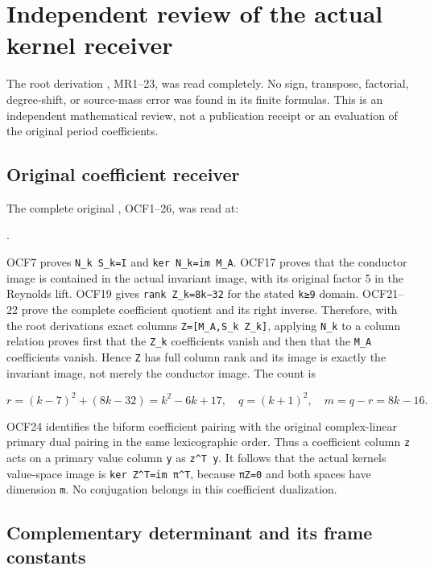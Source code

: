 \documentclass[11pt]{article}
\begin{document}
\section{Independent review of the actual kernel receiver}\label{independent-review-of-the-actual-kernel-receiver}

The root derivation , MR1--23, was read completely. No sign, transpose, factorial, degree-shift, or source-mass error was found in its finite formulas. This is an independent mathematical review, not a publication receipt or an evaluation of the original period coefficients.

\subsection{Original coefficient receiver}\label{original-coefficient-receiver}

The complete original , OCF1--26, was read at:

.

OCF7 proves \texttt{N\_k\ S\_k=I} and \texttt{ker\ N\_k=im\ M\_A}. OCF17 proves that the conductor image is contained in the actual invariant image, with its original factor 5 in the Reynolds lift. OCF19 gives \texttt{rank\ Z\_k=8k−32} for the stated \texttt{k≥9} domain. OCF21--22 prove the complete coefficient quotient and its right inverse. Therefore, with the root derivation\textquotesingle s exact columns \texttt{Z={[}M\_A,S\_k\ Z\_k{]}}, applying \texttt{N\_k} to a column relation proves first that the \texttt{Z\_k} coefficients vanish and then that the \texttt{M\_A} coefficients vanish. Hence \texttt{Z} has full column rank and its image is exactly the invariant image, not merely the conductor image. The count is

\[
r=(k-7)^2+(8k-32)=k^2-6k+17,
\quad q=(k+1)^2,
\quad m=q-r=8k-16.
\]

OCF24 identifies the biform coefficient pairing with the original complex-linear primary dual pairing in the same lexicographic order. Thus a coefficient column \texttt{z} acts on a primary value column \texttt{y} as \texttt{z\^{}T\ y}. It follows that the actual kernel\textquotesingle s value-space image is \texttt{ker\ Z\^{}T=im\ π\^{}T}, because \texttt{πZ=0} and both spaces have dimension \texttt{m}. No conjugation belongs in this coefficient dualization.

\subsection{Complementary determinant and its frame constants}\label{complementary-determinant-and-its-frame-constants}
\end{document}
